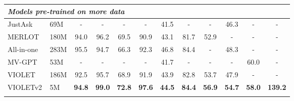 \documentclass[10pt,twocolumn,letterpaper]{article}
\newcommand{\demph}[1]{\textcolor{demphcolor}{#1}}
\newlength\savewidth
\newcommand\shline{\noalign{\global\savewidth\arrayrulewidth\global\arrayrulewidth 1pt}\hline\noalign{\global\arrayrulewidth\savewidth}}
\newcommand{\modelname}{VIOLETv2\xspace}
\newcommand{\modelorig}{VIOLET\xspace}
\begin{document}
\begin{table*}[t]
\begin{tabular}{ll|cccccccc|cc}
         \hline
         \multicolumn{5}{l}{\demph{\textit{Models pre-trained on more data}}}\\
         \hline
        \demph{JustAsk~\cite{yang2021just-ask}}& \demph{69M}  & \demph{-} & \demph{-} & \demph{-}  & \demph{-} & \demph{41.5}  & \demph{-} & \demph{-}  & \demph{46.3}  & \demph{- } & \demph{-}\\
        \demph{MERLOT~\cite{zellers2021merlot}} & \demph{180M}  &   \demph{94.0} & \demph{96.2} & \demph{69.5}  & \demph{90.9} & \demph{43.1}  & \demph{81.7} & \demph{52.9}  & \demph{-}  & \demph{-}  & \demph{-}\\
        \demph{All-in-one~\cite{wang2022all-in-one}} & \demph{283M} & \demph{95.5} & \demph{94.7} & \demph{66.3}  & \demph{92.3} &  \demph{46.8} & \demph{84.4} & \demph{-}  & \demph{48.3}  & \demph{-}  & \demph{-}\\
        \demph{MV-GPT~\cite{seo2022mv-gpt}} & \demph{53M}  & \demph{-} & \demph{-} & \demph{-}  & \demph{-} & \demph{41.7} & \demph{-} & \demph{-}  & \demph{-}  & \demph{60.0}  & \demph{-}\\
        \demph{\modelorig~\cite{fu2021violet}} & \demph{186M}  & \demph{92.5} & \demph{95.7} & \demph{68.9}  & \demph{91.9} & \demph{43.9} & \demph{82.8} & \demph{53.7}  & \demph{47.9}  & \demph{-}  & \demph{-}\\
         \hline
          \modelname & 5M\footnotemark  & \textbf{94.8} & \textbf{99.0} & \textbf{72.8}  & \textbf{97.6} & \textbf{44.5}  & \textbf{84.4} & \textbf{56.9}  & \textbf{54.7}  &  \textbf{58.0}  &  \textbf{139.2}\\
\shline
\end{tabular}
\caption{Comparison with SOTA on \textbf{video question answering} (accuracy) and \textbf{video captioning} (CIDEr). 
  \modelname is pre-trained on WebVid2.5M~\cite{bain2021frozen}+CC3M~\cite{sharma2018cc} with VTM+MLM+MVM (SIF on videos) for 10 epochs. 
  We gray out methods that use significantly more pre-training data. 
}
    \vspace{3pt}
    \label{table:qa}
\end{table*}
 
\end{document}
